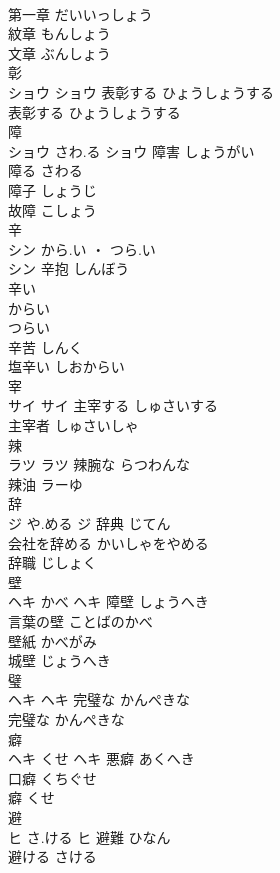 \documentclass[8pt]{extreport}
\begin{document}
\begin{CJK}{UTF8}{min}
\\	第一章	だいいっしょう	
\\	紋章	もんしょう	
\\	文章	ぶんしょう	
\\	彰	
\\	ショウ		ショウ	表彰する	ひょうしょうする	
\\	表彰する	ひょうしょうする	
\\	障	
\\	ショウ	さわ.る	ショウ	障害	しょうがい	
\\	障る	さわる	
\\	障子	しょうじ	
\\	故障	こしょう	
\\	辛	
\\	シン	から.い ・ つら.い
\\	シン	辛抱	しんぼう	
\\	辛い 
\\	からい 
\\	つらい	
\\	辛苦	しんく	
\\	塩辛い	しおからい	
\\	宰	
\\	サイ		サイ	主宰する	しゅさいする	
\\	主宰者	しゅさいしゃ	
\\	辣	
\\	ラツ		ラツ	辣腕な	らつわんな	
\\	辣油	ラーゆ	
\\	辞	
\\	ジ	や.める	ジ	辞典	じてん	
\\	会社を辞める	かいしゃをやめる	
\\	辞職	じしょく	
\\	壁	
\\	ヘキ	かべ	ヘキ	障壁	しょうへき	
\\	言葉の壁	ことばのかべ	
\\	壁紙	かべがみ	
\\	城壁	じょうへき	
\\	璧	
\\	ヘキ		ヘキ	完璧な	かんぺきな	
\\	完璧な	かんぺきな	
\\	癖	
\\	ヘキ	くせ	ヘキ	悪癖	あくへき	
\\	口癖	くちぐせ	
\\	癖	くせ	
\\	避	
\\	ヒ	さ.ける	ヒ	避難	ひなん	
\\	避ける	さける	

\end{CJK}
\end{document}
